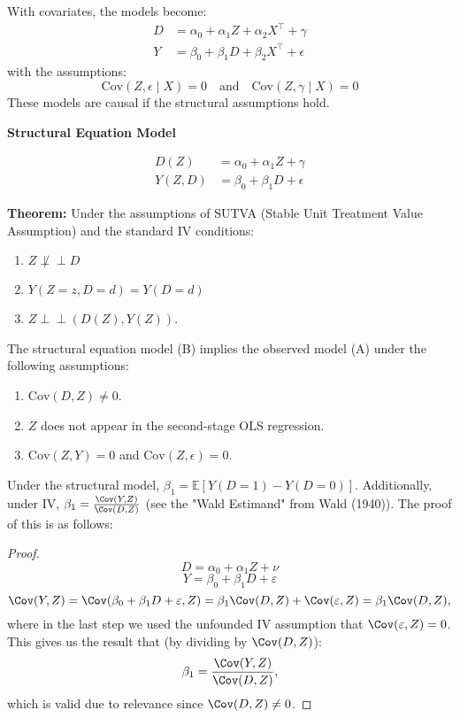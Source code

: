 With covariates, the models become:
\begin{align*}
    D &= \alpha_0 + \alpha_1 Z + \alpha_2 X^\top + \gamma \\
    Y &= \beta_0 + \beta_1 D + \beta_2 X^\top + \epsilon
\end{align*}
with the assumptions:
\[
\text{Cov}(Z, \epsilon \mid X) = 0 \quad \text{and} \quad \text{Cov}(Z, \gamma \mid X) = 0
\]
These models are causal if the structural assumptions hold.

\textbf{Structural Equation Model}

\begin{align*}
    D(Z) &= \alpha_0 + \alpha_1 Z + \gamma \tag{B} \\
    Y(Z, D) &= \beta_0 + \beta_1 D + \epsilon \tag{B}
\end{align*}

\textbf{Theorem:} Under the assumptions of SUTVA (Stable Unit Treatment Value Assumption) and the standard IV conditions:
\begin{enumerate}
    \item {} \(Z \not\perp\!\!\!\perp D\) 
    \item {} \(Y(Z = z, D = d) = Y(D = d)\)
    \item {} \(Z \perp\!\!\!\perp (D(Z), Y(Z))\).
\end{enumerate}

The structural equation model (B) implies the observed model (A) under the following assumptions:
\begin{enumerate}
    \item {} \(\text{Cov}(D, Z) \neq 0\).
    \item {} \(Z\) does not appear in the second-stage OLS regression.
    \item {} \(\text{Cov}(Z, Y) = 0\) and \(\text{Cov}(Z, \epsilon) = 0\).
\end{enumerate}

Under the structural model, $\beta_1 = \mathbb{E}[Y(D=1) - Y(D=0)]$. Additionally, under IV, $\beta_1 = \frac{\Cov(Y,Z)}{\Cov(D,Z)}$ (see the "Wald Estimand" from Wald (1940)). The proof of this is as follows:
\begin{proof}
$$D = \alpha_0 + \alpha_1 Z + \nu$$
$$Y = \beta_0 + \beta_1 D + \varepsilon$$
$$\Cov(Y, Z) = \Cov (\beta_0 + \beta_1 D + \varepsilon, Z) = \beta_1 \Cov(D, Z) + \Cov(\varepsilon, Z) = \beta_1 \Cov(D, Z),$$
where in the last step we used the unfounded IV assumption that $\Cov(\varepsilon, Z) = 0$. This gives us the result that (by dividing by $\Cov(D,Z)$):
$$\beta_1 = \frac{\Cov(Y,Z)}{\Cov(D,Z)},$$
which is valid due to relevance since $\Cov(D, Z) \neq 0$.
\end{proof}

